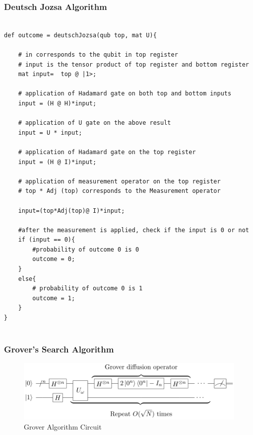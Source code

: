 \subsubsection{Deutsch Jozsa Algorithm}
\begin{lstlisting}

def outcome = deutschJozsa(qub top, mat U){
		
	# in corresponds to the qubit in top register
	# input is the tensor product of top register and bottom register
	mat input=  top @ |1>;
		
	# application of Hadamard gate on both top and bottom inputs
	input = (H @ H)*input;
		
	# application of U gate on the above result
	input = U * input;
		
	# application of Hadamard gate on the top register
	input = (H @ I)*input;
		
	# application of measurement operator on the top register
	# top * Adj (top) corresponds to the Measurement operator
		
	input=(top*Adj(top)@ I)*input;
		
	#after the measurement is applied, check if the input is 0 or not
	if (input == 0){
		#probability of outcome 0 is 0
		outcome = 0;
	}
	else{
		# probability of outcome 0 is 1
		outcome = 1;
	}
}
	
\end{lstlisting}

\subsubsection {Grover's Search Algorithm}

\begin{figure}[h!]
\begin{center}
\includegraphics{grover}
\end{center}
\caption{ Grover Algorithm Circuit 
\label{cir1}}
\end{figure}

